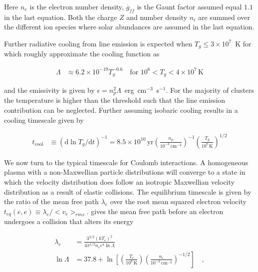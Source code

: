 \documentclass[MScProj_TLRH_ClusterEnergy.tex]{subfiles}
\begin{document}
Here $n_e$ is the electron number density, $\overline{g}_{ff}$ is the Gaunt
factor assumed equal $1.1$ in the last equation. Both the charge $Z$ and number
density $n_i$ are summed over the different ion species where solar abundances
are assumed in the last equation.

Further radiative cooling from line emission is expected when $T_g \leq 3 \times
10^7$~K for which \citet{1977ApJ...215..213M} roughly approximate the cooling 
function as 

\begin{align}
    \Lambda &\approx 6.2 \times 10^{-19} T_g^{-0.6} \quad \text{for } 
    10^6 < T_g < 4 \times 10^7 \, \text{K} \label{eq:linecooling}
\end{align}

\noindent and the emissivity is given by $\epsilon=n_p^2\Lambda$~erg~cm$^{-3}$~s$^{-1}$.
For the majority of clusters the temperature is higher than the threshold such
that the line emission contribution can be neglected. Further assuming isobaric 
cooling results in a cooling timescale given by

\begin{align}
    t_{\text{cool}} &\equiv (\mathrm{d} \ln T_g/ \mathrm{d}t)^{-1}= 8.5 \times 10^{10} \, \text {yr}
    \left( \frac{n_p}{10^{-3} \, \text{cm}^{-3}} \right)^{-1}
    \left( \frac{T_g}{10^8 \, \text{K}} \right)^{1/2} \label{eq:coolingtime}
\end{align}

We now turn to the typical timescale for Coulomb interactions. A homogeneous 
plasma with a non-Maxwellian particle distributions will converge to a state
in which the velocity distribution does follow an isotropic Maxwellian velocity 
distribution as a result of elastic collisions. The equilibrium timescale is 
given by the ratio of the mean free path $\lambda_e$ over the root mean squared 
electron velocity $t_{eq}(e,e) \equiv \lambda_e/<v_e>_{rms}$.
\citet{1956pfig.book.....S} gives the mean free path before an electron undergoes
a collision that alters its energy

\begin{align}
    \lambda_e &= \frac{3^{3/2}(kT_e)^2}{4 \pi^{1/2} n_e e^4 \ln \Lambda}
    \label{eq:coulombmeanfreepath} \\
    \ln \Lambda &= 37.8 + \ln \left[ \left( \frac{T_e}{10^8 \, \text{K}}\right) \right.
    \left. \left( \frac{n_e}{10^{-3} \, \text{cm}^{-3}} \right)^{-1/2} \right]
    \quad , \label{eq:coulomblogarithm}
\end{align}
\end{document}
